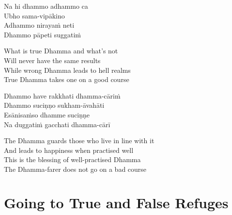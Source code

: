 \suttaRef{[SN 6.2]}

Na hi dhammo adhammo ca\\
Ubho sama-vipākino\\
Adhammo nirayaṁ neti\\
Dhammo pāpeti suggatiṁ

\begin{english}
  What is true Dhamma and what's
  not\\
  Will never have the same results\\
  While wrong
  Dhamma leads to hell realms\\
  True Dhamma takes one on a good course
\end{english}

\begin{paritta}
  Dhammo have rakkhati dhamma-cāriṁ\\
  Dhammo suciṇṇo sukham-āvahāti\\
  Esānisaṁso dhamme suciṇṇe\\
  Na duggatiṁ gacchati dhamma-cārī
\end{paritta}

\begin{english}
  The Dhamma guards those who live in line with it\\
  And leads to happiness when practised well\\
  This is the blessing of well-practised Dhamma\\
  The Dhamma-farer does not go on a bad course
\end{english}

\suttaRef{[Thag 4.10]}


\section{Going to True and False Refuges}
\label{true-false-refuges}

